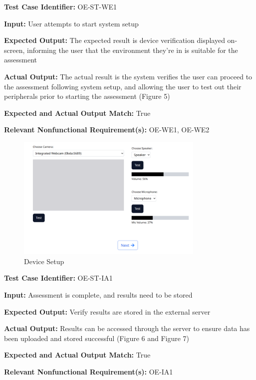\documentclass[12pt, titlepage]{article}
\begin{document}
\begin{mdframed}[linewidth=0.5mm] \par
  \textbf{Test Case Identifier:} OE-ST-WE1 \par
  \textbf{Input:} User attempts to start system setup \par
  \textbf{Expected Output:} The expected result is device verification displayed on-screen, informing the user that the environment they're in is suitable for the assessment \par
  \textbf{Actual Output:} The actual result is the system verifies the user can proceed to the assessment following system setup, and allowing the user to test out their peripherals prior to starting the assessment (Figure 5)\par
  \textbf{Expected and Actual Output Match:} True \par
  \textbf{Relevant Nonfunctional Requirement(s):} OE-WE1, OE-WE2
\end{mdframed}

\begin{figure}[h]
  \centering
  \includegraphics[width=0.8\textwidth]{images/DeviceSetup.png}
  \caption{Device Setup}
\end{figure}

\newpage{}

\begin{mdframed}[linewidth=0.5mm] \par
  \textbf{Test Case Identifier:} OE-ST-IA1 \par
  \textbf{Input:} Assessment is complete, and results need to be stored \par
  \textbf{Expected Output:} Verify results are stored in the external server \par
  \textbf{Actual Output:} Results can be accessed through the server to ensure data has been uploaded and stored successful (Figure 6 and Figure 7)\par
  \textbf{Expected and Actual Output Match:} True \par
  \textbf{Relevant Nonfunctional Requirement(s):} OE-IA1
\end{mdframed}
\end{document}

